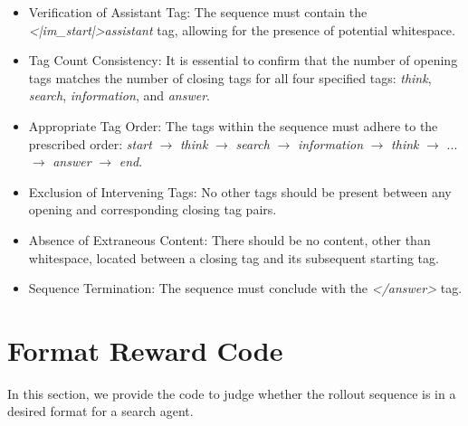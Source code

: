 \begin{itemize}
    \item Verification of Assistant Tag: The sequence must contain the \textit{<|im\_start|>assistant} tag, allowing for the presence of potential whitespace. 
    \item Tag Count Consistency: It is essential to confirm that the number of opening tags matches the number of closing tags for all four specified tags: \textit{think}, \textit{search}, \textit{information}, and \textit{answer}.
    \item Appropriate Tag Order: The tags within the sequence must adhere to the prescribed order: \textit{start} $\rightarrow$ \textit{think} $\rightarrow$ \textit{search} $\rightarrow$ \textit{information} $\rightarrow$ \textit{think} $\rightarrow$ ... $\rightarrow$ \textit{answer} $\rightarrow$ \textit{end}. 
    \item Exclusion of Intervening Tags: No other tags should be present between any opening and corresponding closing tag pairs.
    \item Absence of Extraneous Content: There should be no content, other than whitespace, located between a closing tag and its subsequent starting tag.
    \item Sequence Termination: The sequence must conclude with the \textit{</answer>} tag.
\end{itemize}

\fi

\section{Format Reward Code}\label{apx:sec:format}

In this section, we provide the code to judge whether the rollout sequence is in a desired format for a search agent.

